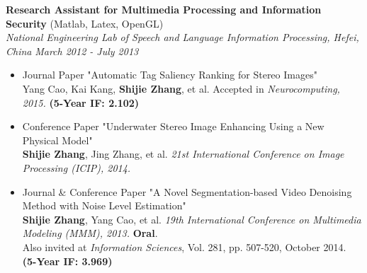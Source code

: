 \documentclass[3pt]{article}
\newenvironment{changemargin}[2]{%
  \begin{list}{}{%
    \setlength{\topsep}{0pt}%
    \setlength{\leftmargin}{#1}%
    \setlength{\rightmargin}{#2}%
    \setlength{\listparindent}{\parindent}%
    \setlength{\itemindent}{\parindent}%
    \setlength{\parsep}{\parskip}%
  }%
  \item[]}{\end{list}
}
\newenvironment{body} {
	\vspace*{-16pt}
	\begin{changemargin}{-0.25in}{-0.5in}
  }	
	{\end{changemargin}
}
\begin{document}
\begin{body}
	\vspace{1pt}
    \textbf{Research Assistant for Multimedia Processing and Information Security} (Matlab, Latex, OpenGL)\\
    \emph{National Engineering Lab of Speech and Language Information Processing,  Hefei, China } \hfill \emph{March 2012 - July 2013 }

        \begin{itemize} \itemsep -0.5pt
  \item{Journal Paper "Automatic Tag Saliency Ranking for Stereo Images"\\
    Yang Cao, Kai Kang,  {\bf Shijie Zhang}, et al.
    Accepted in \emph{Neurocomputing, 2015.} {\small\textbf{{(5-Year IF: 2.102)}}}}

  \item{Conference Paper "Underwater Stereo Image Enhancing Using a New Physical Model"\\
    {\bf Shijie Zhang}, Jing Zhang, et al.
    \emph{21st International Conference on Image Processing (ICIP), 2014.}}

    \item{Journal \& Conference Paper "A Novel Segmentation-based Video Denoising Method with Noise Level Estimation"\\
    {\bf Shijie Zhang}, Yang Cao, et al.
    \emph{19th International Conference on Multimedia Modeling (MMM), 2013.} \textbf{Oral}.\\
    Also invited at \emph{Information Sciences}, Vol. 281, pp. 507-520, October 2014.  {\small\textbf{{(5-Year IF: 3.969)}}} }
      \end{itemize}

\end{body}
\end{document}
